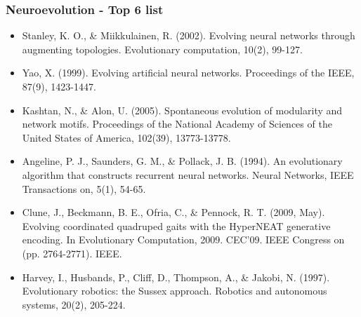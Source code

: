 \documentclass[8pt]{beamer}
\begin{document}
\begin{frame}
\frametitle{Neuroevolution - Top 6 list}
\begin{itemize}
	\item Stanley, K. O., \& Miikkulainen, R. (2002). Evolving neural networks through augmenting topologies. Evolutionary computation, 10(2), 99-127.
	\item Yao, X. (1999). Evolving artificial neural networks. Proceedings of the IEEE, 87(9), 1423-1447.
	\item Kashtan, N., \& Alon, U. (2005). Spontaneous evolution of modularity and network motifs. Proceedings of the National Academy of Sciences of the United States of America, 102(39), 13773-13778.
	\item Angeline, P. J., Saunders, G. M., \& Pollack, J. B. (1994). An evolutionary algorithm that constructs recurrent neural networks. Neural Networks, IEEE Transactions on, 5(1), 54-65.
	\item Clune, J., Beckmann, B. E., Ofria, C., \& Pennock, R. T. (2009, May). Evolving coordinated quadruped gaits with the HyperNEAT generative encoding. In Evolutionary Computation, 2009. CEC'09. IEEE Congress on (pp. 2764-2771). IEEE.
	\item Harvey, I., Husbands, P., Cliff, D., Thompson, A., \& Jakobi, N. (1997). Evolutionary robotics: the Sussex approach. Robotics and autonomous systems, 20(2), 205-224.
\end{itemize}
\end{frame}
\end{document}
